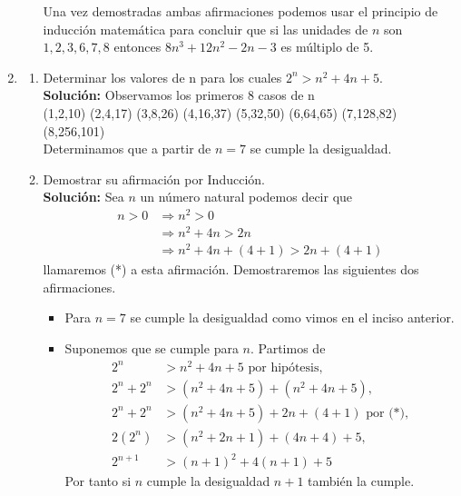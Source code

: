 \documentclass[10pt,letterpaper,fleqn]{article}
\begin{document}
\begin{enumerate}
\begin{enumerate}
            Una vez demostradas ambas afirmaciones podemos usar el principio de inducción matemática para concluir que si las unidades de $n$ son $1,2,3,6,7,8$ entonces $8n^3 + 12n^2 - 2n -3$ es múltiplo de 5.

        \end{enumerate}

        \item \begin{enumerate}
            
            \item Determinar los valores de n para los cuales $2^n > n^2 + 4n + 5$.\\
            \textbf{Solución: } Observamos los primeros 8 casos de n \\
            (1,2,10) (2,4,17) (3,8,26) (4,16,37) (5,32,50) (6,64,65) (7,128,82) (8,256,101)\\
            Determinamos que a partir de $n=7$ se cumple la desigualdad.

            \item Demostrar su afirmación por Inducción.\\
            \textbf{Solución: } Sea $n$ un número natural podemos decir que 
            \begin{equation*}
            \begin{split}
                n > 0 &\Rightarrow n^2 > 0 \\
                      &\Rightarrow n^2 + 4n > 2n \\
                      &\Rightarrow n^2 + 4n +(4+1) > 2n + (4+1)  
            \end{split}
            \end{equation*} llamaremos (*) a esta afirmación.
            Demostraremos las siguientes dos afirmaciones.\\
            \begin{itemize}

                \item Para $n=7$ se cumple la desigualdad como vimos en el inciso anterior.
                \item Suponemos que se cumple para $n$. Partimos de 
                \begin{equation*}
                \begin{split}  
                          2^n &> n^2 + 4n + 5 \text{ por hipótesis},\\
                    2^n + 2^n &> (n^2 + 4n + 5) + (n^2 + 4n +5), \\
                    2^n + 2^n &> (n^2 + 4n + 5) + 2n + (4+1) \text{ por (*)}, \\
                        2(2^n)&> (n^2 + 2n + 1) + (4n + 4) + 5,\\
                      2^{n+1} &> (n+1)^2 + 4(n+1) + 5 
                \end{split}
                \end{equation*}
                Por tanto si $n$ cumple la desigualdad $n+1$ también la cumple.         
            \end{itemize}


\end{enumerate}
\end{enumerate}
\end{document}
